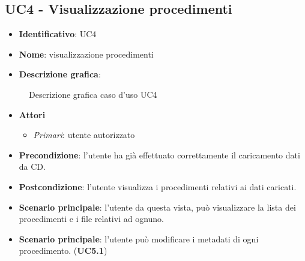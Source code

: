 
\subsection{UC4 - Visualizzazione procedimenti}
\begin{itemize}
  \item \textbf{Identificativo}: UC4
  \item \textbf{Nome}: visualizzazione procedimenti
  \item \textbf{Descrizione grafica}:
\end{itemize}

\begin{figure}[h]
  \centering
  \caption{Descrizione grafica caso d'uso UC4}
\end{figure}

\begin{itemize}
  \item \textbf{Attori}
        \begin{itemize}
          \item \textit{Primari}: utente autorizzato
        \end{itemize}
  \item \textbf{Precondizione}: l'utente ha già effettuato correttamente il caricamento dati da CD.
  \item \textbf{Postcondizione}: l'utente visualizza i procedimenti relativi ai dati caricati.
  \item \textbf{Scenario principale}: l'utente da questa vista, può visualizzare la lista dei procedimenti e i file relativi ad ognuno.
  \item \textbf{Scenario principale}: l'utente può modificare i metadati di ogni procedimento. (\textbf{UC5.1})
\end{itemize}